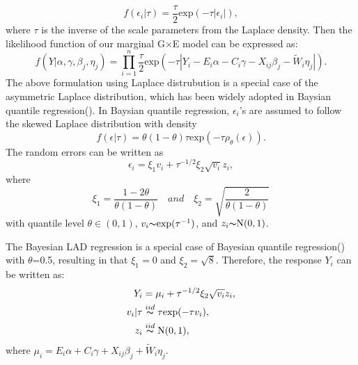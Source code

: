 \documentclass[12pt]{article}
\begin{document}
\begin{equation*}
f(\epsilon_{i}|\tau) = \frac{\tau}{2} \text{exp} (-\tau|\epsilon_{i}|),
\end{equation*}
where $\tau$ is the inverse of the scale parameters from the Laplace density. Then the likelihood function of our marginal G$\times$E model can be expressed as:
\begin{equation*}
f(Y|\alpha, \gamma, \beta_{j}, \eta_{j}) = \prod_{i=1}^{n} \frac{\tau}{2} \text{exp} (-\tau|Y_{i}-E_{i}\alpha - C_{i}\gamma - X_{ij}\beta_{j} - \tilde{W}_{i}\eta_{j}|).
\end{equation*}
The above formulation using Laplace distrubution is a special case of the asymmetric Laplace distribution, which has been widely adopted in Baysian quantile regression(\cite{MOY,YUK}). In Baysian quantile regression, $\epsilon_{i}$'s are assumed to follow the skewed Laplace distribution with density
\begin{equation*}\label{equr:full}
f(\epsilon|\tau) = \theta(1-\theta)\tau \text{exp}(-\tau \rho_{\theta}(\epsilon)).
\end{equation*}
The random errors can be written as 
\begin{equation*}
\epsilon_{i} = \xi_{1} v_{i} + \tau^{-1/2}\xi_{2}\sqrt{v_{i}}z_{i},
\end{equation*}
where
\begin{equation*}\label{equr:full}
\xi_{1}  = \frac{1 - 2\theta}{\theta(1-\theta)} \quad and \quad  \xi_{2} = \sqrt{\frac{2}{\theta(1-\theta)}}
\end{equation*}
with quantile level $\theta\in(0,1)$, $v_{i}{\thicksim}\text{exp}(\tau^{-1})$, and $z_{i}{\thicksim}\text{N}(0,1)$.\par
The Bayesian LAD regression is a special case of Bayesian quantile regression(\cite{NANLIN}) with $\theta$=0.5, resulting in that $\xi_{1} =0$ and $\xi_{2} =\sqrt{8}$. Therefore, the response $Y_{i}$ can be written as:
\begin{equation}\label{equr:ge2}
\begin{aligned}
Y_{i} &= \mu_{i} + \tau^{-1/2}\xi_{2}\sqrt{v_{i}}z_{i}, \\
v_{i}|\tau & \stackrel{iid}{\thicksim}\tau \text{exp}(- \tau v_{i}),\\
z_{i} & \stackrel{iid}{\thicksim}\text{N}(0,1),
\end{aligned}
\end{equation}
where $\mu_{i} = E_{i}\alpha + C_{i}\gamma + X_{ij}\beta_{j} + \tilde{W}_{i}\eta_{j}$.
\end{document}
